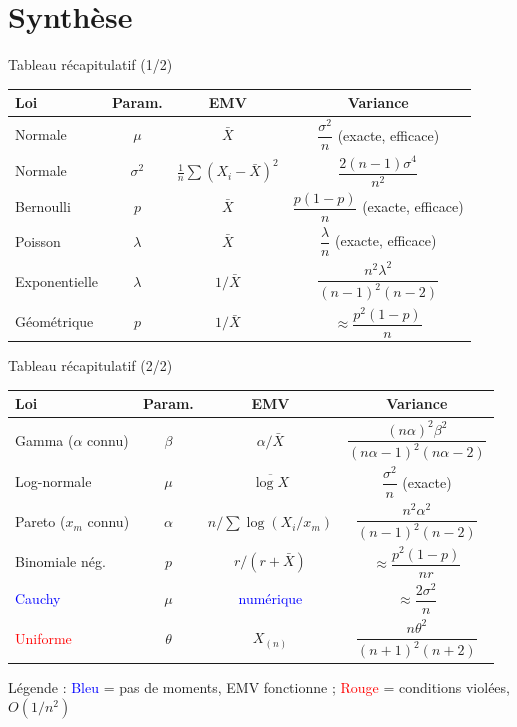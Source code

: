 \documentclass[11pt,aspectratio=169]{beamer}
\begin{document}
\section{Synthèse}

\begin{frame}{Tableau récapitulatif (1/2)}

\begin{center}
\small
\begin{tabular}{lccc}
\hline
Loi & Param. & EMV & Variance \\
\hline
Normale & $\mu$ & $\bar{X}$ & $\dfrac{\sigma^2}{n}$ (exacte, efficace) \\[0.5em]
Normale & $\sigma^2$ & $\frac{1}{n}\sum(X_i-\bar{X})^2$ & $\dfrac{2(n-1)\sigma^4}{n^2}$ \\[0.5em]
Bernoulli & $p$ & $\bar{X}$ & $\dfrac{p(1-p)}{n}$ (exacte, efficace) \\[0.5em]
Poisson & $\lambda$ & $\bar{X}$ & $\dfrac{\lambda}{n}$ (exacte, efficace) \\[0.5em]
Exponentielle & $\lambda$ & $1/\bar{X}$ & $\dfrac{n^2\lambda^2}{(n-1)^2(n-2)}$ \\[0.5em]
Géométrique & $p$ & $1/\bar{X}$ & $\approx \dfrac{p^2(1-p)}{n}$ \\[0.3em]
\hline
\end{tabular}
\end{center}

\end{frame}

\begin{frame}{Tableau récapitulatif (2/2)}

\begin{center}
\small
\begin{tabular}{lccc}
\hline
Loi & Param. & EMV & Variance \\
\hline
Gamma ($\alpha$ connu) & $\beta$ & $\alpha/\bar{X}$ & $\dfrac{(n\alpha)^2\beta^2}{(n\alpha-1)^2(n\alpha-2)}$ \\[0.5em]
Log-normale & $\mu$ & $\overline{\log X}$ & $\dfrac{\sigma^2}{n}$ (exacte) \\[0.5em]
Pareto ($x_m$ connu) & $\alpha$ & $n/\sum\log(X_i/x_m)$ & $\dfrac{n^2\alpha^2}{(n-1)^2(n-2)}$ \\[0.5em]
Binomiale nég. & $p$ & $r/(r+\bar{X})$ & $\approx \dfrac{p^2(1-p)}{nr}$ \\[0.5em]
\textcolor{blue}{Cauchy} & $\mu$ & \textcolor{blue}{numérique} & $\approx \dfrac{2\sigma^2}{n}$ \\[0.5em]
\textcolor{red}{Uniforme} & $\theta$ & $X_{(n)}$ & $\dfrac{n\theta^2}{(n+1)^2(n+2)}$ \\[0.3em]
\hline
\end{tabular}
\end{center}

\small
Légende : \textcolor{blue}{Bleu} = pas de moments, EMV fonctionne ; \textcolor{red}{Rouge} = conditions violées, $O(1/n^2)$

\end{frame}
\end{document}
